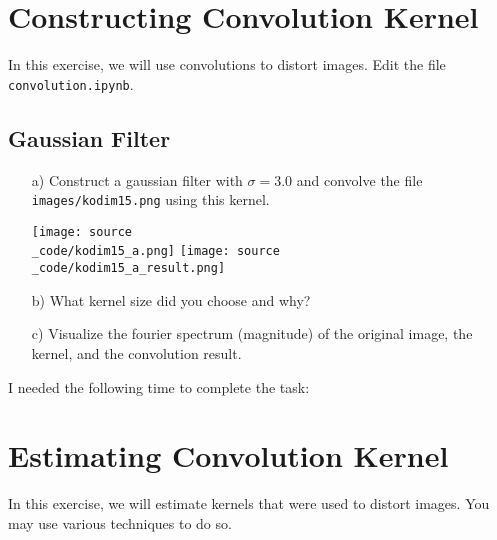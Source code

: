 \def\firstname{firstname}
\def\lastname{lastname}
\def\aufgabenblatt{4}




\thispagestyle{page1} 

\section{Constructing Convolution Kernel}

In this exercise, we will use convolutions to distort images. Edit the file \texttt{convolution.ipynb}.

\subsection{Gaussian Filter}

\begin{enumerate}

\item[a)] Construct a gaussian filter with $\sigma=3.0$ and convolve the file \texttt{images/kodim15.png} using this kernel. 
\begin{center}
\texttt{[image: source\\\_code/kodim15\_a.png]}
\texttt{[image: source\\\_code/kodim15\_a\_result.png]}
\end{center}

\item[b)] What kernel size did you choose and why?
\item[c)] Visualize the fourier spectrum (magnitude) of the original image, the kernel, and the convolution result.

\end{enumerate}

I needed the following time to complete the task:

\section{Estimating Convolution Kernel}

In this exercise, we will estimate kernels that were used to distort images. You may use various techniques to do so.

